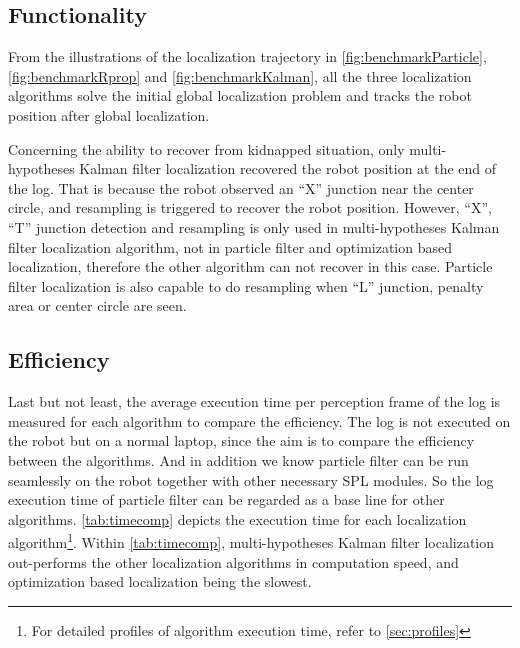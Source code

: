 \subsection{Functionality}
\label{sub:Functionality}

From the illustrations of the localization trajectory in \autoref{fig:benchmarkParticle}, \autoref{fig:benchmarkRprop} and \autoref{fig:benchmarkKalman}, all the three localization algorithms solve the initial global localization problem and tracks the robot position after global localization. 

Concerning the ability to recover from kidnapped situation, only multi-hypotheses Kalman filter localization recovered the robot position at the end of the log. That is because the robot observed an ``X'' junction near the center circle, and resampling is triggered to recover the robot position. However, ``X'', ``T'' junction detection and resampling is only used in multi-hypotheses Kalman filter localization algorithm, not in particle filter and optimization based localization, therefore the other algorithm can not recover in this case. Particle filter localization is also capable to do resampling when ``L'' junction, penalty area or center circle are seen.

\subsection{Efficiency}
\label{sub:Efficiency}
Last but not least, the average execution time per perception frame of the log is measured for each algorithm to compare the efficiency. The log is not executed on the robot but on a normal laptop, since the aim is to compare the efficiency between the algorithms. And in addition we know particle filter can be run seamlessly on the robot together with other necessary \gls{SPL} modules. So the log execution time of particle filter can be regarded as a base line for other algorithms. \autoref{tab:timecomp} depicts the execution time for each localization algorithm\footnote{For detailed profiles of algorithm execution time, refer to \autoref{sec:profiles}}. Within \autoref{tab:timecomp}, multi-hypotheses Kalman filter localization out-performs the other localization algorithms in computation speed, and optimization based localization being the slowest.




